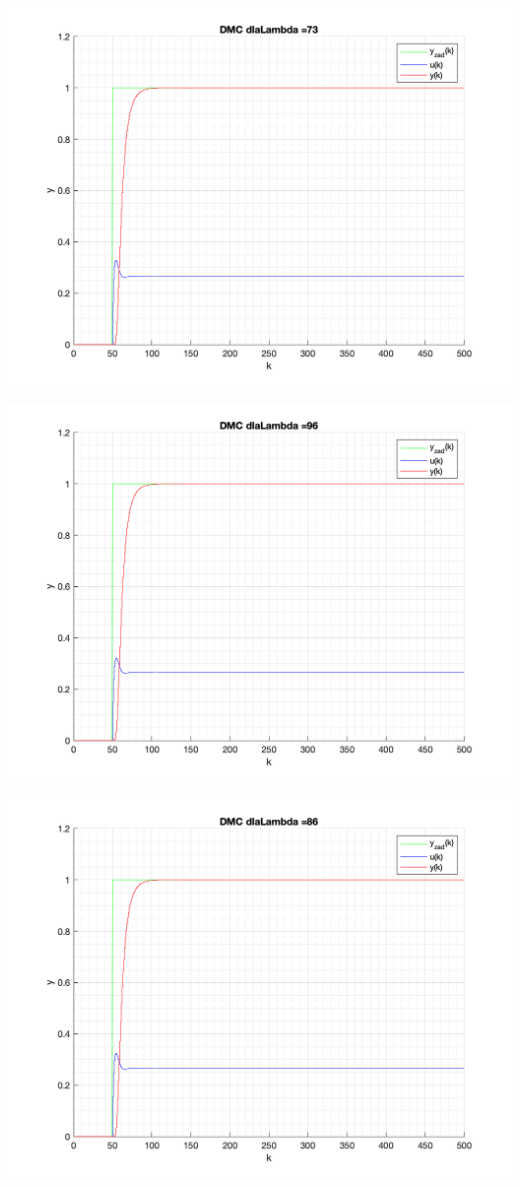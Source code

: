 \documentclass[a4paper, 11pt]{article}
\begin{document}
\begin{enumerate}
 \includegraphics[width=\linewidth]{./ModelsP4_Lambda/P4_DMC_Lambda_73_png.png} 
 
 \includegraphics[width=\linewidth]{./ModelsP4_Lambda/P4_DMC_Lambda_96_png.png} 
 
 \includegraphics[width=\linewidth]{./ModelsP4_Lambda/P4_DMC_Lambda_86_png.png} 
 

\end{enumerate}
\end{document}
